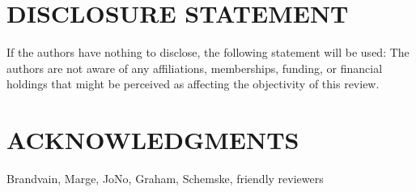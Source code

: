 \documentclass{ar-1col}
\begin{document}
\section*{DISCLOSURE STATEMENT}
If the authors have nothing to disclose, the following statement will be used: The authors are not aware of any affiliations, memberships, funding, or financial holdings that
might be perceived as affecting the objectivity of this review.

\section*{ACKNOWLEDGMENTS}
Brandvain, Marge, JoNo, Graham, Schemske, friendly reviewers
\end{document}
